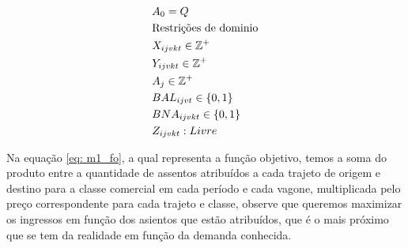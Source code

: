 \begin{align}
	 & A_{0} = Q                                                                                                                                                                                                      \label{eq: m1_ini_disponi}                 \\
	 & \text{Restrições de dominio}  \notag                                                                                                                                                                                                                      \\
	 & X_{ijvkt} \in \mathbb{Z}^+                                                                                                                                                                                     \label{eq: m1_dom_assig}                   \\
	 & Y_{ijvkt} \in \mathbb{Z}^+                                                                                                                                                                                     \label{eq: m1_dom_autho}                   \\
	 & A_{j} \in \mathbb{Z}^+                                                                                                                                                                                         \label{eq: m1_dom_disponi}                 \\
	 & BAL_{ijvt} \in \{0,1\}                                                                                                                                                                                    \label{eq: m1_dom_bin_all}                      \\
	 & BNA_{ijvkt} \in \{0,1\}                                                                                                                                                                                   \label{eq: m1_dom_bin_nadja}                    \\
	 & Z_{ijvkt} : Livre                                                                                                                                                                                     \label{eq: m1_dom_bin_true_last_value}
\end{align}


Na equação \ref{eq: m1_fo}, a qual representa a função objetivo, temos a soma do produto entre a quantidade de assentos atribuídos a cada trajeto de origem e destino para a classe comercial em cada período e cada vagone, multiplicada pelo preço correspondente para cada trajeto e classe, observe que queremos maximizar os ingressos em função dos asientos que estão atribuídos, que é o mais próximo que se tem da realidade em função da demanda conhecida.

